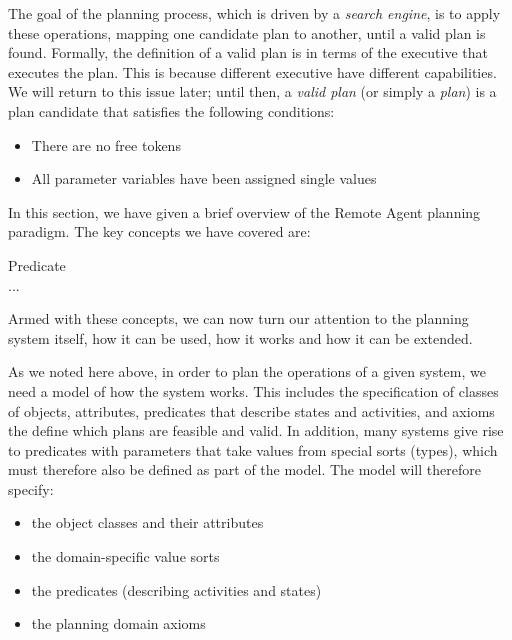 The goal of the planning process, which is driven by a {\em search
engine}, is to apply these operations, mapping one candidate plan to
another, until a valid plan is found.  Formally, the definition of a
valid plan is in terms of the executive that executes the plan.  This
is because different executive have different capabilities.  We will
return to this issue later; until then, a {\em valid plan} (or simply
a {\em plan}) is a plan candidate that satisfies the following
conditions:
  \begin{itemize}
  \item There are no free tokens
  \item All parameter variables have been assigned single values
  \end{itemize}



In this section, we have given a brief overview of the Remote Agent
planning paradigm.  The key concepts we have covered are:
  \begin{description}
  \item[Predicate] 
  \item[...]
  \end{description}

Armed with these concepts, we can now turn our attention to the
planning system itself, how it can be used, how it works and how it
can be extended.








As we noted here above, in order to plan the operations of a given
system, we need a model of how the system works.  This includes the
specification of classes of objects, attributes, predicates that
describe states and activities, and axioms the define which plans are
feasible and valid.  In addition, many systems give rise to predicates
with parameters that take values from special sorts (types), which
must therefore also be defined as part of the model.  The model will
therefore specify:
  \begin{itemize}
  \item the object classes and their attributes
  \item the domain-specific value sorts
  \item the predicates (describing activities and states)
  \item the planning domain axioms
  \end{itemize}

